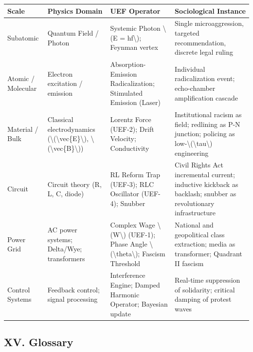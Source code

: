 {{\def\LTcaptype{none} %
\begin{longtable}[]{@{}llll@{}}
\toprule\noalign{}
Scale & Physics Domain & UEF Operator & Sociological Instance \\
\midrule\noalign{}
\endhead
\bottomrule\noalign{}
\endlastfoot
Subatomic & Quantum Field / Photon & Systemic Photon \textbackslash(E =
hf\textbackslash); Feynman vertex & Single microaggression, targeted
recommendation, discrete legal ruling \\
Atomic / Molecular & Electron excitation / emission &
Absorption-Emission Radicalization; Stimulated Emission (Laser) &
Individual radicalization event; echo-chamber amplification cascade \\
Material / Bulk & Classical electrodynamics
(\textbackslash(\textbackslash vec\{E\}\textbackslash),
\textbackslash(\textbackslash vec\{B\}\textbackslash)) & Lorentz Force
(UEF-2); Drift Velocity; Conductivity & Institutional racism as field;
redlining as P-N junction; policing as
low-\textbackslash(\textbackslash tau\textbackslash) engineering \\
Circuit & Circuit theory (R, L, C, diode) & RL Reform Trap (UEF-3); RLC
Oscillator (UEF-4); Snubber & Civil Rights Act incremental current;
inductive kickback as backlash; snubber as revolutionary
infrastructure \\
Power Grid & AC power systems; Delta/Wye; transformers & Complex Wage
\textbackslash(W\textbackslash) (UEF-1); Phase Angle
\textbackslash(\textbackslash theta\textbackslash); Fascism Threshold &
National and geopolitical class extraction; media as transformer;
Quadrant II fascism \\
Control Systems & Feedback control; signal processing & Interference
Engine; Damped Harmonic Operator; Bayesian update & Real-time
suppression of solidarity; critical damping of protest waves \\
\end{longtable}
}

\protect{}\label{sec-glossary}
\subsection{XV. Glossary}\label{xv.-glossary}

}
